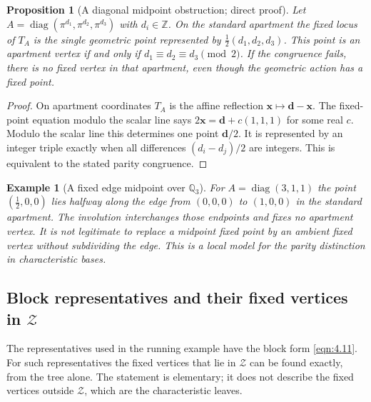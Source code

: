 \documentclass[12pt,letterpaper]{amsart}
\numberwithin{equation}{section}
\newtheorem{proposition}[theorem]{Proposition}
\newtheorem{example}[theorem]{Example}
\theoremstyle{definition}
\theoremstyle{plain}
\begin{document}
\begin{proposition}[A diagonal midpoint obstruction; direct proof]
\label{prop:new-diagonal}
Let $A=\operatorname{diag}(\pi^{d_1},\pi^{d_2},\pi^{d_3})$
with $d_i\in\mathbb Z$. On the standard apartment the fixed locus of
$T_A$ is the single geometric point represented by
$\tfrac12(d_1,d_2,d_3)$.
This point is an apartment vertex if and only if
$d_1\equiv d_2\equiv d_3\pmod 2$.
If the congruence fails, there is no fixed vertex \emph{in that
apartment}, even though the geometric action has a fixed point.
\end{proposition}
\begin{proof}
On apartment coordinates $T_A$ is the affine reflection
$\boldsymbol x\mapsto\boldsymbol d-\boldsymbol x$.
The fixed-point equation modulo the scalar line says
$2\boldsymbol x=\boldsymbol d+c(1,1,1)$ for some real $c$.
Modulo the scalar line this determines one point
$\boldsymbol d/2$. It is represented by an integer triple exactly
when all differences $(d_i-d_j)/2$ are integers. This is equivalent
to the stated parity congruence.
\end{proof}

\begin{example}[A fixed edge midpoint over $\mathbb Q_3$]
For $A=\operatorname{diag}(3,1,1)$ the point
$(\frac12,0,0)$ lies halfway along the edge from
$(0,0,0)$ to $(1,0,0)$ in the standard apartment. The involution
interchanges those endpoints and fixes no apartment vertex. It is
not legitimate to replace a midpoint fixed point by an ambient fixed
vertex without subdividing the edge. This is a local model for the
parity distinction in characteristic bases.
\end{example}

\subsection{Block representatives and their fixed vertices in $\mathcal Z$}
\label{sec:new-Zfix}

The representatives used in the running example have the block form
\eqref{eqn:4.11}. For such representatives the fixed vertices that lie
in $\mathcal Z$ can be found exactly, from the tree alone. The
statement is elementary; it does not describe the fixed vertices
outside $\mathcal Z$, which are the characteristic leaves.
\end{document}
